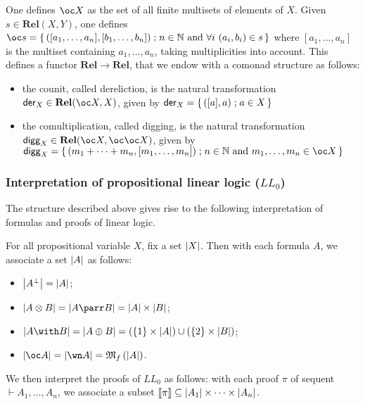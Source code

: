 One defines \(\oc X\) as the set of all finite multisets of elements of
\(X\). Given \(s\in\mathbf{Rel}(X,Y)\), one defines
\(\oc s=\set{([a_1,\dots,a_n],[b_1,\dots,b_n])}{n\in\mathbb N\ \text{and}\ \forall i\ (a_i,b_i)\in s}\)
where \([a_1,\dots,a_n]\) is the multiset containing \(a_1,\dots,a_n\),
taking multiplicities into account. This defines a functor
\(\mathbf{Rel}\to\mathbf{Rel}\), that we endow with a comonad structure
as follows:

\begin{itemize}
\tightlist
\item
  the counit, called dereliction, is the natural transformation
  \(\mathsf{der}_X\in\mathbf{Rel}(\oc X,X)\), given by
  \(\mathsf{der}_X=\left\{\,{([a],a)}\mathrel{;}{a\in X}\,\right\}\)
\item
  the comultiplication, called digging, is the natural transformation
  \(\mathsf{digg}_X\in\mathbf{Rel}(\oc X,\oc\oc X)\), given by
  \(\mathsf{digg}_X=\set{(m_1+\cdots+m_n,[m_1,\dots,m_n])}{n\in\mathbb N\ \text{and}\ m_1,\dots,m_n\in\oc X}\)
\end{itemize}

\subsubsection{\texorpdfstring{Interpretation of propositional linear
logic
(\(LL_0\))}{Interpretation of propositional linear logic (LL\_0)}}\label{interpretation-of-propositional-linear-logic-ll_0}

The structure described above gives rise to the following interpretation
of formulas and proofs of linear logic.

For all propositional variable \(X\), fix a set \(\left|X\right|\). Then with
each formula \(A\), we associate a set \(\left|A\right|\) as follows:

\begin{itemize}
\tightlist
\item
  \(\left|A^\bot\right|=\left|A\right|\);
\item
  \(\web{A\tens B}=\web{A\parr B}=\web A\times\web B\);
\item
  \(\web{A\with B}=\web{A\plus B}=(\{1\}\times\web A)\cup(\{2\}\times\web B)\);
\item
  \(\web{\oc A}=\web{\wn A}=\finmulset{\web A}\).
\end{itemize}

We then interpret the proofs of \(LL_0\) as follows: with each proof
\(\pi\) of sequent \(\vdash A_1,\ldots,A_n\), we associate a subset
\(\left\llbracket \pi\right\rrbracket\subseteq\left|A_1\right|\times\cdots\times\left|A_n\right|\).

